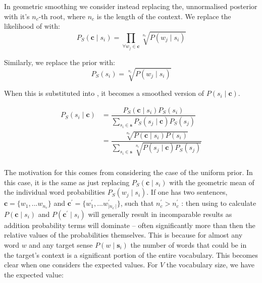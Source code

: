 \documentclass{sig-alternate}
\renewcommand{\c}{\mathbf{c}}
\newcommand{\s}{\mathbf{s}}
\begin{document}
In geometric smoothing we consider instead replacing the, unnormalised posterior  with it's $n_c$-th root, where $n_c$ is the length of the context.
We replace the likelihood of  with:
\begin{equation} \label{eq:contrextprobsmooth}
P_S(\c \mid s_{i})=\prod_{\forall w_{j}\in\c}\sqrt[n_c]{P(w_{j} \mid s_{i})}
\end{equation}

Similarly, we replace the prior with:
\begin{equation} \label{eq:priorsmoothed}
P_S(s_{i})= \sqrt[n_c]{P(w_{j} \mid s_{i})}
\end{equation}


When this is substituted into , it becomes a smoothed version of $P(s_{i} \mid \c)$.


\begin{equation} \label{eq:generalwsdsmoothed}
\begin{aligned}
P_S(s_{i}\mid\c) %
&=\dfrac{P_{S}(\c\mid s_{i})P_S(s_{i})}
{\sum_{s_{i}\in\s} P_{S}(s_{j}\mid\c) P_S(s_{j})} \\
%
&=\dfrac{\sqrt[n_c]{P(\c\mid s_{i})P(s_{i})}}
{\sum_{s_{i}\in\s} \sqrt[n_c]{P(s_{j}\mid\c)P_S(s_{j})}} \\
%
\end{aligned}
\end{equation}

The motivation for this comes from considering the case of the uniform prior.
In this case, it is the same as just replacing $P_S(\c \mid s_{i})$ with the geometric mean of the individual word probabilities $P_S(w_j \mid s_{i})$.
If one has two sentences, $\c=\{w_1,...w_{n_c}\}$ and $\c^\prime=\{w_1^\prime,...w^\prime_{|n_{c^\prime}|}\}$, such that $n_c^\prime > n_c^\prime$ :
then using  to calculate $P(\c \mid s_{i})$ and $P(\c^\prime \mid s_{i})$ will generally result in incomparable results as addition probability terms will dominate -- often significantly more than then the relative values of the probabilities themselves. This is because for almost any word $w$ and any target sense $P(w \mid \s_i)$ the number of words that could be in the target's context is a significant portion of the entire vocabulary.
This becomes clear when one considers the expected values. For $V$ the vocabulary size, we have the expected value:
\end{document}
